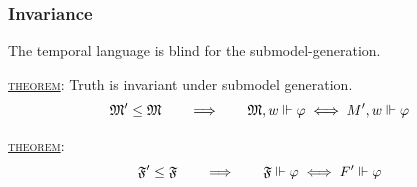 \documentclass[xcolor=x11names]{beamer}
\newcommand{\dzsa}[1]{\textsc{\underline{#1}}:}
\begin{document}

\begin{frame}
\frametitle{Invariance}
The temporal language is blind for the submodel-generation.

\bigskip

\dzsa{theorem}
Truth is invariant under submodel generation.
\[ \mathfrak M' \leq \mathfrak M \qquad \Longrightarrow \qquad
\mathfrak M , w \Vdash \varphi \iff \mathfrak  \mathfrak M', w \Vdash \varphi \]

\bigskip

\dzsa{theorem}
\[ \mathfrak F' \leq \mathfrak F \qquad \Longrightarrow \qquad
\mathfrak F\Vdash \varphi \iff \mathfrak  \mathfrak F' \Vdash \varphi \]

\end{frame}

\end{document}
